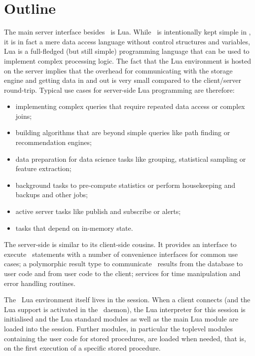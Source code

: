 \section{Outline}
The main server interface
besides \sql\ is Lua.
While \sql\ is intentionally kept simple in \nowdb,
it is in fact a mere data access language
without control structures and variables,
Lua is a full-fledged (but still simple)
programming language that can be used to
implement complex processing logic.
The fact that the Lua environment is hosted
on the server implies that the overhead
for communicating with the storage engine
and getting data in and out is very small
compared to the client/server round-trip.
Typical use cases for server-side Lua programming
are therefore:

\begin{itemize}
\item implementing complex queries that require
      repeated data access or complex joins;
\item building algorithms that are beyond simple queries
      like path finding or recommendation engines; 
\item data preparation for data science tasks
      like grouping, statistical sampling or
       feature extraction; 
\item background tasks to pre-compute statistics or
      perform housekeeping and backups
      and other  jobs;
\item active server tasks like publish and subscribe or alerts;
\item tasks that depend on in-memory state.
\end{itemize}

The server-side  is similar
to its client-side cousins. It provides
an interface to execute \sql\ statements with
a number of convenience interfaces for common
use cases; a polymorphic result type
to communicate \sql\ results from the database
to user code and
from user code to the client; services for
time manipulation and error handling routines.

The \nowdb\ Lua environment itself
lives in the session.
When a client connects
(and the Lua support
is activated in the \nowdb\ daemon),
the Lua interpreter for this session is initialised
and the Lua standard modules 
as well as the main Lua module are loaded
into the session.
Further modules, in particular the toplevel modules
containing the user code for stored procedures,
are loaded when needed, that is, on the first
execution of a specific stored procedure.

